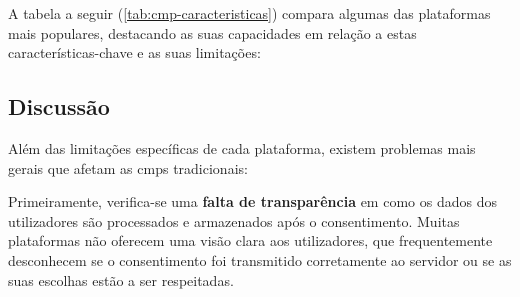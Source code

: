 A tabela a seguir (\ref{tab:cmp-caracteristicas}) compara algumas das plataformas mais populares, destacando as suas capacidades em relação a estas características-chave e as suas limitações:

\begin{table}[H]
\centering
\caption{Comparação das principais características das \acrshort{cmp}s existentes}
\label{tab:cmp-caracteristicas}
\end{table}


\subsection{Discussão}

Além das limitações específicas de cada plataforma, existem problemas mais gerais que afetam as \acrshort{cmp}s tradicionais:

Primeiramente, verifica-se uma \textbf{falta de transparência} em como os dados dos utilizadores são processados e armazenados após o consentimento. Muitas plataformas não oferecem uma visão clara aos utilizadores, que frequentemente desconhecem se o consentimento foi transmitido corretamente ao servidor ou se as suas escolhas estão a ser respeitadas.

